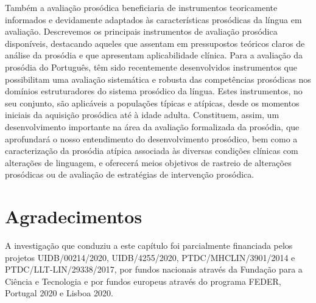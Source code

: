 \documentclass[output=paper,colorlinks,citecolor=brown,booklanguage=portuguese]{langscibook}
\begin{document}
Também a avaliação prosódica beneficiaria de instrumentos teoricamente informados e devidamente adaptados às características prosódicas da língua em avaliação. Descrevemos os principais instrumentos de avaliação prosódica disponíveis, destacando aqueles que assentam em pressupostos teóricos claros de análise da prosódia e que apresentam aplicabilidade clínica. Para a avaliação da prosódia do Português, têm sido recentemente desenvolvidos instrumentos que possibilitam uma avaliação sistemática e robusta das competências prosódicas nos domínios estruturadores do sistema prosódico da língua. Estes instrumentos, no seu conjunto, são aplicáveis a populações típicas e atípicas, desde os momentos iniciais da aquisição prosódica até à idade adulta. Constituem, assim, um desenvolvimento importante na área da avaliação formalizada da prosódia, que aprofundará o nosso entendimento do desenvolvimento prosódico, bem como a caracterização da prosódia atípica associada às diversas condições clínicas com alterações de linguagem, e oferecerá meios objetivos de rastreio de alterações prosódicas ou de avaliação de estratégias de intervenção prosódica.

\clearpage
\section*{Agradecimentos}
A investigação que conduziu a este capítulo foi parcialmente financiada pelos projetos UIDB/00214/2020, UIDB/4255/2020, PTDC/MHCLIN/3901/2014 e PTDC{\slash}LLT-LIN/29338/2017, por fundos nacionais através da Fundação para a Ciência e Tecnologia e por fundos europeus através do programa FEDER, Portugal 2020 e Lisboa 2020.


{\sloppy\printbibliography[heading=subbibliography,notkeyword=this]}
\end{document}
